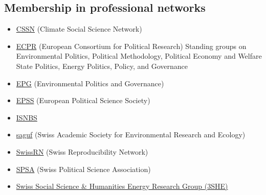     \subsection{Membership in professional networks}\label{memberships-in-professional-networks}
\begin{itemize}[leftmargin=2.75cm,itemsep=2pt]
   \item
  \href{https://cssn.org/scholar/g-bruckmann/}{CSSN} (Climate Social Science Network)
  \item \href{https://ecpr.eu}{ECPR} (European Consortium for Political Research) Standing groups on Environmental Politics, Political Methodology, Political Economy and Welfare State Politics, Energy Politics, Policy, and Governance
\item
  \href{https://epgnetwork.org/}{EPG} (Environmental Politics and Governance)
\item
  \href{https://epssnet.org/}{EPSS} (European Political Science Society)
  \item
 \href{https://isnbs.org/}{ISNBS}
\item
  \href{https://saguf.ch/en}{saguf} (Swiss Academic Society for Environmental Research and Ecology)
\item
  \href{https://www.swissrn.org/contents/academy/\#GraciaBr\%C3\%BCckmann}{SwissRN} (Swiss Reproducibility Network)
\item
  \href{https://www.svpw-assp.ch/}{SPSA} (Swiss Political Science Association)
\item
  \href{https://t1p.de/SSHEnergy}{Swiss Social Science \& Humanities Energy Research Group (3SHE)}
  \end{itemize}
